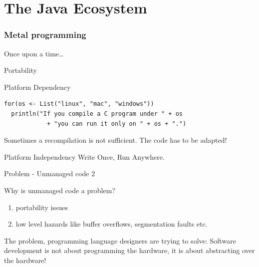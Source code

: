 \part[The Java Ecosystem]{The Java Ecosystem}
\section{Metal programming}

\begin{frame}{Once upon a time\ldots}
\end{frame}

\begin{frame}[fragile]{Portability}
\begin{alertblock}{Platform Dependency}
\begin{lstlisting}
for(os <- List("linux", "mac", "windows"))
  println("If you compile a C program under " + os
            + "you can run it only on " + os + ".")
\end{lstlisting}
\end{alertblock}
\pause
Sometimes a recompilation is not sufficient. \alert{The code} has to be adapted!
\pause
\begin{block}{Platform Independency}
Write Once, Run Anywhere.
\end{block}
\end{frame}


\begin{frame}{Problem - Unmanaged code 2}
\begin{block}{Why is unmanaged code a problem?}
\begin{enumerate}
  \pause
  \item portability issues
  \pause
  \item low level hazards like buffer overflows, segmentation faults etc.
\end{enumerate}
\end{block}
\pause
\begin{alertblock}{The problem, programming language designers are trying to
solve:} Software development is not about programming the hardware, it is about
abstracting over the hardware!
\end{alertblock}
\end{frame}


